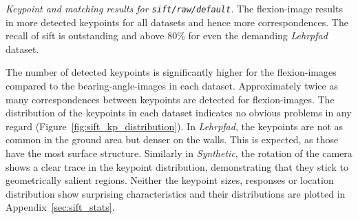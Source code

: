 \begin{table}[ht]
    {\renewcommand{\arraystretch}{1.2}%
    \setlength{\tabcolsep}{0.3em}%
    \footnotesize

    }
    \caption[Keypoint and matching results for \texttt{\acrshort{sift}/raw/default}]{\emph{Keypoint and matching results for \texttt{\acrshort{sift}/raw/default}.} The \gls{flexion-image} results in more detected keypoints for all datasets and hence more correspondences. The recall of \acrshort{sift} is outstanding and above 80\% for even the demanding \emph{Lehrpfad} dataset.}
\end{table}
The number of detected keypoints is significantly higher for the \glspl{flexion-image} compared to the \glspl{bearing-angle-image} in each dataset.
Approximately twice as many correspondences between keypoints are detected for \glspl{flexion-image}.
The distribution of the keypoints in each dataset indicates no obvious problems in any regard (Figure~\ref{fig:sift_kp_distribution}).
In \emph{Lehrpfad}, the keypoints are not as common in the ground area but denser on the walls.
This is expected, as those have the most surface structure.
Similarly in \emph{Synthetic}, the rotation of the camera shows a clear trace in the keypoint distribution, demonstrating that they stick to geometrically salient regions.
Neither the keypoint sizes, responses or location distribution show surprising characteristics and their distributions are plotted in Appendix~\ref{sec:sift_stats}.

